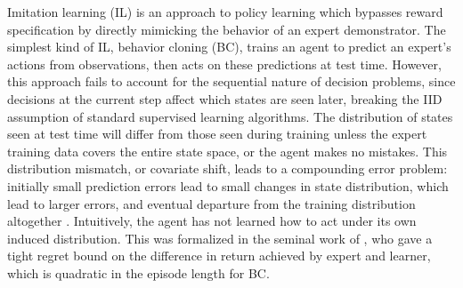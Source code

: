 \documentclass[10pt]{article} %
\theoremstyle{plain}
\theoremstyle{definition}
\theoremstyle{remark}
\begin{document}
% 
% 
Imitation learning (IL) is an approach to policy learning which bypasses reward specification by directly mimicking the behavior of an expert demonstrator. The simplest kind of IL, behavior cloning (BC), trains an agent to predict an expert's actions from observations, then acts on these predictions at test time. 
However, this approach fails to account for the sequential nature of decision problems, since decisions at the current step affect which states are seen later, breaking the IID assumption of standard supervised learning algorithms. The distribution of states seen at test time will differ from those seen during training unless the expert training data covers the entire state space, or the agent makes no mistakes. This distribution mismatch, or covariate shift, leads to a compounding error problem: initially small prediction errors lead to small changes in state distribution, which lead to larger errors, and eventual departure from the training distribution altogether \citep{ALVINN}. Intuitively, the agent has not learned how to act under its own induced distribution. This was formalized in the seminal work of \cite{Bagnell1}, who gave a tight regret bound on the difference in return achieved by expert and learner, which is quadratic in the episode length for BC.
\end{document}

